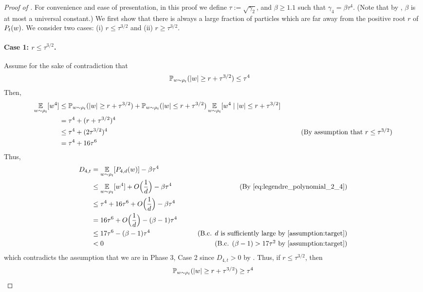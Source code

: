 \begin{proof}[Proof of ]
For convenience and ease of presentation, in this proof we define $\tau := \sqrt{\gamma_2}$, and $\beta \geq 1.1$ such that $\gamma_4 = \beta \tau^4$. (Note that by , $\beta$ is at most a universal constant.) We first show that there is always a large fraction of particles which are far away from the positive root $r$ of $P_t(w)$. We consider two cases: (i) $r \leq \tau^{3/2}$ and (ii) $r \geq \tau^{3/2}$.

\paragraph{Case 1: $r \leq \tau^{3/2}$.} Assume for the sake of contradiction that
\begin{align}
\mathbb{P}_{w \sim \rho_t}(|w| \geq r + \tau^{3/2}) 
& \leq \tau^4
\end{align}
Then,
\begin{align}
\E_{\w \sim \rho_t}[\w^4]
& \leq \Prob_{\w \sim \rho_t}(|\w| \geq r + \tau^{3/2}) + \Prob_{\w \sim \rho_t}(|\w| \leq r + \tau^{3/2}) \E_{\w \sim \rho_t}[\w^4 \mid |\w| \leq r + \tau^{3/2}] \\
& = \tau^4 + (r + \tau^{3/2})^4 \\
& \leq \tau^4 + (2 \tau^{3/2})^4 
& \tag{By assumption that $r \leq \tau^{3/2}$} \\
& = \tau^4 + 16 \tau^6
\end{align}
Thus,
\begin{align}
D_{4, t}
& = \E_{\w \sim \rho_t}[\PfourD(\w)] - \beta \tau^4 \\
& \leq \E_{\w \sim \rho_t}[\w^4] + O\Big(\frac{1}{d}\Big) - \beta \tau^4
& \tag{By \Cref{eq:legendre_polynomial_2_4}} \\
& \leq \tau^4 + 16 \tau^6 + O\Big(\frac{1}{d}\Big) - \beta \tau^4 \\
& = 16 \tau^6 + O\Big(\frac{1}{d}\Big) - (\beta - 1)\tau^4 \\
& \leq 17 \tau^6 - (\beta - 1)\tau^4 
& \tag{B.c. $d$ is sufficiently large by \Cref{assumption:target}} \\
& < 0
& \tag{B.c. $(\beta - 1) > 17 \tau^2$ by \Cref{assumption:target}}
\end{align}
which contradicts the assumption that we are in Phase 3, Case 2 since $D_{4, t} > 0$ by . Thus, if $r \leq \tau^{3/2}$, then
\begin{align}
\mathbb{P}_{w \sim \rho_t}(|w| \geq r + \tau^{3/2}) \geq \tau^4
\end{align}


\end{proof}
